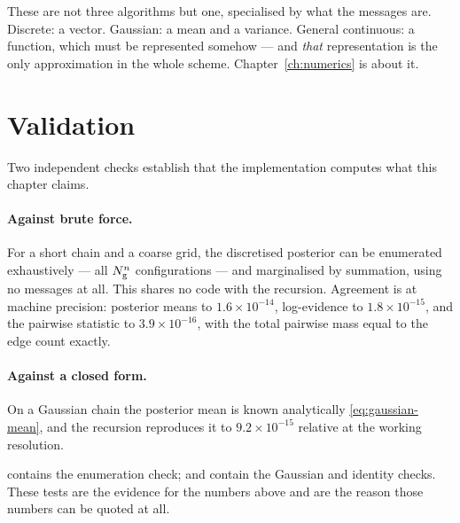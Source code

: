 \begin{intuition}
These are not three algorithms but one, specialised by what the messages are. Discrete: a
vector. Gaussian: a mean and a variance. General continuous: a function, which must be
represented somehow --- and \emph{that} representation is the only approximation in the whole
scheme. Chapter~\ref{ch:numerics} is about it.
\end{intuition}

\section{Validation}
\label{sec:bp-validation}

Two independent checks establish that the implementation computes what this chapter claims.

\paragraph{Against brute force.} For a short chain and a coarse grid, the discretised
posterior can be enumerated exhaustively --- all $N_{\mathrm{g}}^{n}$ configurations --- and
marginalised by summation, using no messages at all. This shares no code with the recursion.
Agreement is at machine precision: posterior means to $1.6\times10^{-14}$, log-evidence to
$1.8\times10^{-15}$, and the pairwise statistic to $3.9\times10^{-16}$, with the total pairwise
mass equal to the edge count exactly.

\paragraph{Against a closed form.} On a Gaussian chain the posterior mean is known
analytically \eqref{eq:gaussian-mean}, and the recursion reproduces it to $9.2\times10^{-15}$
relative at the working resolution.

\begin{codebox}
 contains the enumeration check;
 and 
contain the Gaussian and identity checks. These tests are the evidence for the numbers above
and are the reason those numbers can be quoted at all.
\end{codebox}
